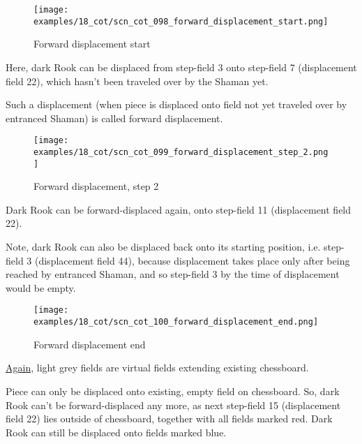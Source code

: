 \vspace*{-1.0\baselineskip}
\noindent
\begin{figure}[!h]
\texttt{[image: examples/18\_cot/scn\_cot\_098\_forward\_displacement\_start.png]}
\caption{Forward displacement start}
\label{fig:scn_cot_098_forward_displacement_start}
\end{figure}

Here, dark Rook can be displaced from step-field 3 onto step-field 7 (displacement
field 22), which hasn't been traveled over by the Shaman yet.

Such a displacement (when piece is displaced onto field not yet traveled over by
entranced Shaman) is called forward displacement.

\clearpage %

\noindent
\begin{figure}[!h]
\texttt{[image: examples/18\_cot/scn\_cot\_099\_forward\_displacement\_step\_2.png]}
\caption{Forward displacement, step 2}
\label{fig:scn_cot_099_forward_displacement_step_2}
\end{figure}

Dark Rook can be forward-displaced again, onto step-field 11 (displacement field 22).

Note, dark Rook can also be displaced back onto its starting position, i.e. step-field
3 (displacement field 44), because displacement takes place only after being reached
by entranced Shaman, and so step-field 3 by the time of displacement would be empty.

\clearpage %

\noindent
\begin{figure}[!h]
\texttt{[image: examples/18\_cot/scn\_cot\_100\_forward\_displacement\_end.png]}
\caption{Forward displacement end}
\label{fig:scn_cot_100_forward_displacement_end}
\end{figure}

\hyperref[fig:scn_hd_06_centaur_off_board]{Again},
light grey fields are virtual fields extending existing chessboard.

Piece can only be displaced onto existing, empty field on chessboard. So, dark Rook
can't be forward-displaced any more, as next step-field 15 (displacement field 22)
lies outside of chessboard, together with all fields marked red. Dark Rook can still
be displaced onto fields marked blue.

